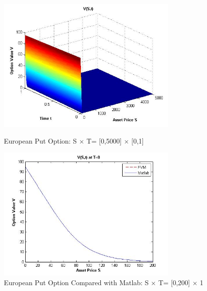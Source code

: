 \documentclass[final]{siamltex}
\begin{document}
\begin{figure}[H]
	\centering
	\includegraphics[width=0.8\textwidth]{European_put_all}
	\caption{European Put Option: S $\times $ T= [0,5000] $\times $ [0,1]}
	
	\includegraphics[width=0.8\textwidth]{European_Put_Final_all}
	\caption{European Put Option Compared with Matlab: S $\times $ T= [0,200] $\times $ {1}}
	\label{European_put_all}	
\end{figure}
\end{document}
